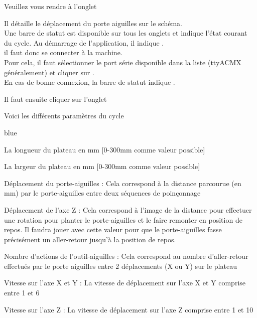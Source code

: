Veuillez vous rendre à l'onglet 


Il détaille le déplacement du porte aiguilles sur le schéma.\\

Une barre de statut est disponible sur tous les onglets et indique l'état courant du cycle. Au démarrage de l'application, il indique .\\

il faut donc se connecter à la machine.\\
Pour cela, il faut sélectionner le port série disponible dans la liste (ttyACMX généralement) et cliquer sur .\\
En cas de bonne connexion, la barre de statut indique .


Il faut ensuite cliquer sur l'onglet 


Voici les différents paramètres du cycle
\begin{items}{blue}{\Triangle}
    \item La longueur du plateau en mm [0-300mm comme valeur possible]
    \item La largeur du plateau en mm [0-300mm comme valeur possible]
    \item Déplacement du porte-aiguilles : Cela correspond à la distance parcourue (en mm) par le porte-aiguilles entre deux séquences de poinçonnage
    \item Déplacement de l'axe Z : Cela correspond à l'image de la distance pour effectuer une rotation pour planter le porte-aiguilles et le faire remonter en position de repos. Il faudra jouer avec cette valeur pour que le porte-aiguilles fasse précisément un aller-retour jusqu'à la position de repos.
    \item Nombre d'actions de l'outil-aiguilles : Cela correspond au nombre d'aller-retour effectués par le porte aiguilles entre 2 déplacements (X ou Y) sur le plateau
    \item Vitesse sur l'axe X et Y : La vitesse de déplacement sur l'axe X et Y comprise entre 1 et 6
    \item Vitesse sur l'axe Z : La vitesse de déplacement sur l'axe Z comprise entre 1 et 10
\end{items}

